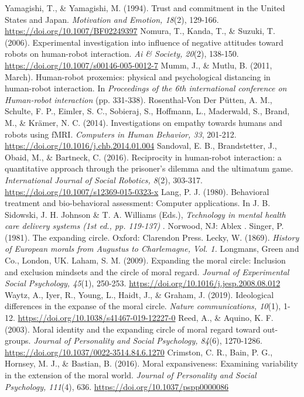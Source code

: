 \documentclass[a4j,12pt]{jreport}
\begin{document}
\begin{thebibliography}{999}
 Yamagishi, T., \& Yamagishi, M. (1994). Trust and commitment in the United States and Japan. \textsl{Motivation and Emotion, 18}(2), 129-166. \url{https://doi.org/10.1007/BF02249397}
 Nomura, T., Kanda, T., \& Suzuki, T. (2006). Experimental investigation into influence of negative attitudes toward robots on human-robot interaction. \textsl{Ai \& Society, 20}(2), 138-150. \url{https://doi.org/10.1007/s00146-005-0012-7}
 Mumm, J., \& Mutlu, B. (2011, March). Human-robot proxemics: physical and psychological distancing in human-robot interaction. In \textsl{Proceedings of the 6th international conference on Human-robot interaction} (pp. 331-338).
 Rosenthal-Von Der P\"{u}tten, A. M., Schulte, F. P., Eimler, S. C., Sobieraj, S., Hoffmann, L., Maderwald, S., Brand, M., \& Kr\"{a}mer, N. C. (2014). Investigations on empathy towards humans and robots using fMRI. \textsl{Computers in Human Behavior, 33}, 201-212. \url{https://doi.org/10.1016/j.chb.2014.01.004}
 Sandoval, E. B., Brandstetter, J., Obaid, M., \& Bartneck, C. (2016). Reciprocity in human-robot interaction: a quantitative approach through the prisoner’s dilemma and the ultimatum game. \textsl{International Journal of Social Robotics, 8}(2), 303-317. \url{https://doi.org/10.1007/s12369-015-0323-x}
 Lang, P. J. (1980). Behavioral treatment and bio-behavioral assessment: Computer applications. In J. B. Sidowski, J. H. Johnson \& T. A. Williams (Eds.), \textsl{Technology in mental health care delivery systems (1st ed., pp. 119-137)} . Norwood, NJ: Ablex .
 Singer, P. (1981). The expanding circle. Oxford: Clarendon Press.
 Lecky, W. (1869). \textsl{History of European morals from Augustus to Charlemagne, Vol. 1.} Longmans, Green and Co., London, UK. 
 Laham, S. M. (2009). Expanding the moral circle: Inclusion and exclusion mindsets and the circle of moral regard. \textsl{Journal of Experimental Social Psychology, 45}(1), 250-253. \url{https://doi.org/10.1016/j.jesp.2008.08.012}
 Waytz, A., Iyer, R., Young, L., Haidt, J., \& Graham, J. (2019). Ideological differences in the expanse of the moral circle. \textsl{Nature communications, 10}(1), 1-12. \url{https://doi.org/10.1038/s41467-019-12227-0}
 Reed, A., \& Aquino, K. F. (2003). Moral identity and the expanding circle of moral regard toward out-groups. \textsl{Journal of Personality and Social Psychology, 84}(6), 1270-1286. \url{https://doi.org/10.1037/0022-3514.84.6.1270}
 Crimston, C. R., Bain, P. G., Hornsey, M. J., \& Bastian, B. (2016). Moral expansiveness: Examining variability in the extension of the moral world. \textsl{Journal of Personality and Social Psychology, 111}(4), 636. \url{https://doi.org/10.1037/pspp0000086}

\end{thebibliography}
\end{document}

